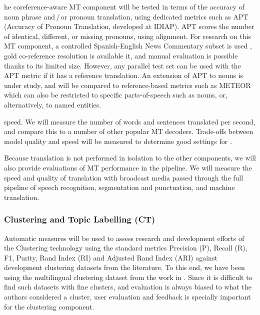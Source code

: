 he coreference-aware MT component will be tested in terms of the accuracy of noun phrase and$\,$/$_{\,}$or pronoun translation, using dedicated metrics such as APT (Accuracy of Pronoun Translation, developed at IDIAP).  APT scores the number of identical, different, or missing pronouns, using alignment.  For research on this MT component, a controlled Spanish-English News Commentary subset  is used ,  gold co-reference resolution is available  it, and  manual evaluation is possible thanks to its limited size.  However, any parallel test set can be used with the APT metric if it has a reference translation.  An extension of APT to nouns is under study, and will be compared to reference-based metrics such as METEOR which can also be restricted to specific parts-of-speech such as nouns, or, alternatively, to named entities.

 speed. We will measure the number of words and sentences translated per second, and compare this to a number of other popular MT decoders. Trade-offs between model quality and speed will be measured to determine good settings for . 

Because translation is not performed in isolation to the other \SUMMA components, we will also provide evaluations of MT performance in the \SUMMA pipeline. We will measure the speed and quality of translation with broadcast media passed through the full pipeline of speech recognition, segmentation and punctuation, and machine translation. 


\subsubsection{Clustering and Topic Labelling (CT)}

Automatic measures will be used to assess research and development efforts of the Clustering technology using the standard metrics Precision (P), Recall (R), F1, Purity, Rand Index (RI) and Adjusted Rand Index (ARI) against development clustering datasets from the literature. To this end, we have been using the multilingual clustering dataset from the work in \citet{Rupnik16News}. Since it is difficult to find such datasets with fine clusters, and evaluation is always biased to what the authors considered a cluster, user evaluation and feedback is specially important for the clustering component.

